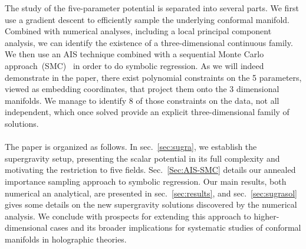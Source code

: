 \documentclass[11pt,a4paper]{article}
\begin{document}
The study of the five-parameter potential is separated into several parts. We first use a gradient descent to efficiently sample the underlying conformal manifold. Combined with numerical analyses, including a local principal component analysis, we can identify the existence of a three-dimensional continuous family. We then use an AIS technique combined with a sequential Monte Carlo approach~(SMC)~\cite{del2006sequential} in order to do symbolic regression. As we will indeed demonstrate in the paper, there exist polynomial constraints on the 5 parameters, viewed as embedding coordinates, that project them onto the 3 dimensional manifolds. We manage to identify 8 of those constraints on the data, not all independent, which once solved  provide an explicit three-dimensional family of solutions.

\paragraph{}
The paper is organized as follows. In sec.~\ref{sec:sugra}, we establish the supergravity setup, presenting the scalar potential in its full complexity and motivating the restriction to five fields. Sec.~\ref{Sec:AIS-SMC} details our annealed importance sampling approach to symbolic regression. Our main results, both numerical an analytical, are presented in sec.~\ref{sec:results}, and sec.~\ref{sec:sugrasol} gives some details on the new supergravity solutions discovered by the numerical analysis. We conclude with prospects for extending this approach to higher-dimensional cases and its broader implications for systematic studies of conformal manifolds in holographic theories.


\end{document}

